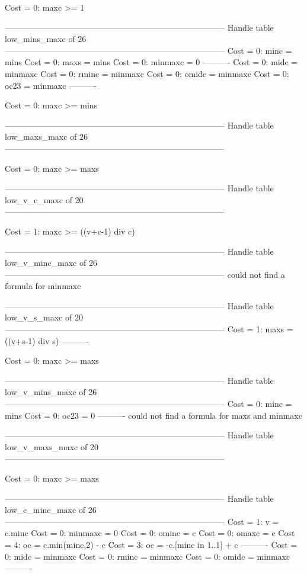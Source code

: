 Cost =  0:  maxc >= 1

--------------------------------------------------------------------------------
Handle table low_mins_maxc of 26
--------------------------------------------------------------------------------
Cost =  0:  minc    = mins
Cost =  0:  maxs    = mins
Cost =  0:  minmaxc = 0
----------
Cost =  0:  midc    = minmaxc
Cost =  0:  rminc   = minmaxc
Cost =  0:  omidc   = minmaxc
Cost =  0:  oc23    = minmaxc
----------

Cost =  0:  maxc >= mins

--------------------------------------------------------------------------------
Handle table low_maxs_maxc of 26
--------------------------------------------------------------------------------

Cost =  0:  maxc >= maxs

--------------------------------------------------------------------------------
Handle table low_v_c_maxc of 20
--------------------------------------------------------------------------------

Cost =  1:  maxc >= ((v+c-1) div c)

--------------------------------------------------------------------------------
Handle table low_v_minc_maxc of 26
--------------------------------------------------------------------------------
could not find a formula for minmaxc


--------------------------------------------------------------------------------
Handle table low_v_s_maxc of 20
--------------------------------------------------------------------------------
Cost =  1:  maxs = ((v+s-1) div s)
----------

Cost =  0:  maxc >= maxs

--------------------------------------------------------------------------------
Handle table low_v_mins_maxc of 26
--------------------------------------------------------------------------------
Cost =  0:  minc    = mins
Cost =  0:  oc23    = 0
----------
could not find a formula for maxs and minmaxc


--------------------------------------------------------------------------------
Handle table low_v_maxs_maxc of 20
--------------------------------------------------------------------------------

Cost =  0:  maxc >= maxs

--------------------------------------------------------------------------------
Handle table low_c_minc_maxc of 26
--------------------------------------------------------------------------------
Cost =  1:  v       = c.minc
Cost =  0:  minmaxc = 0
Cost =  0:  ominc   = c
Cost =  0:  omaxc   = c
Cost =  4:  oc      = c.min(minc,2) - c
Cost =  3:  oc      = -c.[minc in 1..1] + c
----------
Cost =  0:  midc    = minmaxc
Cost =  0:  rminc   = minmaxc
Cost =  0:  omidc   = minmaxc
----------

